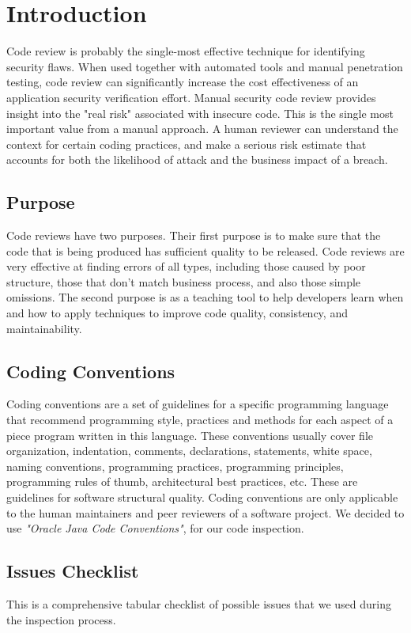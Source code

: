 \chapter{Introduction} \label{chap1}
Code review is probably the single-most effective technique for identifying security flaws. When used together with automated tools and manual penetration testing, code review can significantly increase the cost effectiveness of an application security verification effort.
Manual security code review provides insight into the "real risk" associated with insecure code. This is the single most important value from a manual approach. A human reviewer can understand the context for certain coding practices, and make a serious risk estimate that accounts for both the likelihood of attack and the business impact of a breach.

\section{Purpose}
Code reviews have two purposes. Their first purpose is to make sure that the code that is being produced has sufficient quality to be released. Code reviews are very effective at finding errors of all types, including those caused by poor structure, those that don't match business process, and also those simple omissions.
The second purpose is as a teaching tool to help developers learn when and how to apply techniques to improve code quality, consistency, and maintainability. 

\section{Coding Conventions}
Coding conventions are a set of guidelines for a specific programming language that recommend programming style, practices and methods for each aspect of a piece program written in this language. These conventions usually cover file organization, indentation, comments, declarations, statements, white space, naming conventions, programming practices, programming principles, programming rules of thumb, architectural best practices, etc. These are guidelines for software structural quality. Coding conventions are only applicable to the human maintainers and peer reviewers of a software project.
We decided to use \textit{"Oracle Java Code Conventions"}, for our code inspection.

\section{Issues Checklist}
This is a comprehensive tabular checklist of possible issues that we used during the inspection process.

